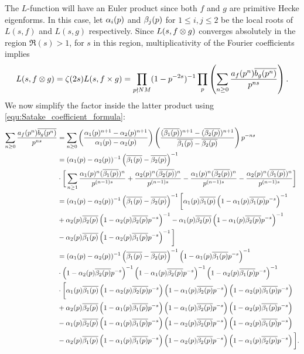       The $L$-function will have an Euler product since both $f$ and $g$ are primitive Hecke eigenforms. In this case, let $\alpha_{i}(p)$ and $\beta_{j}(p)$ for $1 \le i,j \le 2$ be the local roots of $L(s,f)$ and $L(s,g)$ respectively. Since $L(s,f \otimes g)$ converges absolutely in the region $\Re(s) > 1$, for $s$ in this region, multiplicativity of the Fourier coefficients implies
      \[
        L(s,f \otimes g) = \zeta(2s)L(s,f \times g) = \prod_{p \nmid NM}(1-p^{-2s})^{-1}\prod_{p}\left(\sum_{n \ge 0}\frac{a_{f}(p^{n})\overline{b_{g}(p^{n})}}{p^{ns}}\right).
      \]
      We now simplify the factor inside the latter product using \cref{equ:Satake_coefficient_formula}:
      \begingroup
      \allowdisplaybreaks
        \begin{align*}
          \sum_{n \ge 0}\frac{a_{f}(p^{n})\overline{b_{g}(p^{n})}}{p^{ns}} &= \sum_{n \ge 0}\left(\frac{\alpha_{1}(p)^{n+1}-\alpha_{2}(p)^{n+1}}{\alpha_{1}(p)-\alpha_{2}(p)}\right)\left(\frac{(\overline{\beta_{1}(p)})^{n+1}-(\overline{\beta_{2}(p)})^{n+1}}{\overline{\beta_{1}(p)}-\overline{\beta_{2}(p)}}\right)p^{-ns} \\
          &= (\alpha_{1}(p)-\alpha_{2}(p))^{-1}\left(\overline{\beta_{1}(p)}-\overline{\beta_{2}(p)}\right)^{-1} \\
          &\cdot \bigg[\sum_{n \ge 1}\frac{\alpha_{1}(p)^{n}(\overline{\beta_{1}(p)})^{n}}{p^{(n-1)s}}+\frac{\alpha_{2}(p)^{n}(\overline{\beta_{2}(p)})^{n}}{p^{(n-1)s}}-\frac{\alpha_{1}(p)^{n}(\overline{\beta_{2}(p)})^{n}}{p^{(n-1)s}}-\frac{\alpha_{2}(p)^{n}(\overline{\beta_{1}(p)})^{n}}{p^{(n-1)s}}\bigg] \\
          &= (\alpha_{1}(p)-\alpha_{2}(p))^{-1}\left(\overline{\beta_{1}(p)}-\overline{\beta_{2}(p)}\right)^{-1}\bigg[\alpha_{1}(p)\overline{\beta_{1}(p)}\left(1-\alpha_{1}(p)\overline{\beta_{1}(p)}p^{-s}\right)^{-1} \\
          &+\alpha_{2}(p)\overline{\beta_{2}(p)}\left(1-\alpha_{2}(p)\overline{\beta_{2}(p)}p^{-s}\right)^{-1}-\alpha_{1}(p)\overline{\beta_{2}(p)}\left(1-\alpha_{1}(p)\overline{\beta_{2}(p)}p^{-s}\right)^{-1} \\
          &-\alpha_{2}(p)\overline{\beta_{1}(p)}\left(1-\alpha_{2}(p)\overline{\beta_{1}(p)}p^{-s}\right)^{-1}\bigg] \\
          &= (\alpha_{1}(p)-\alpha_{2}(p))^{-1}\left(\overline{\beta_{1}(p)}-\overline{\beta_{2}(p)}\right)^{-1}\left(1-\alpha_{1}(p)\overline{\beta_{1}(p)}p^{-s}\right)^{-1} \\
          &\cdot\left(1-\alpha_{2}(p)\overline{\beta_{2}(p)}p^{-s}\right)^{-1}\left(1-\alpha_{1}(p)\overline{\beta_{2}(p)}p^{-s}\right)^{-1}\left(1-\alpha_{2}(p)\overline{\beta_{1}(p)}p^{-s}\right)^{-1} \\
          &\cdot\bigg[\alpha_{1}(p)\overline{\beta_{1}(p)}\left(1-\alpha_{2}(p)\overline{\beta_{2}(p)}p^{-s}\right)\left(1-\alpha_{1}(p)\overline{\beta_{2}(p)}p^{-s}\right)\left(1-\alpha_{2}(p)\overline{\beta_{1}(p)}p^{-s}\right) \\
          &+\alpha_{2}(p)\overline{\beta_{2}(p)}\left(1-\alpha_{1}(p)\overline{\beta_{1}(p)}p^{-s}\right)\left(1-\alpha_{1}(p)\overline{\beta_{2}(p)}p^{-s}\right)\left(1-\alpha_{2}(p)\overline{\beta_{1}(p)}p^{-s}\right) \\
          &-\alpha_{1}(p)\overline{\beta_{2}(p)}\left(1-\alpha_{1}(p)\overline{\beta_{1}(p)}p^{-s}\right)\left(1-\alpha_{2}(p)\overline{\beta_{2}(p)}p^{-s}\right)\left(1-\alpha_{2}(p)\overline{\beta_{1}(p)}p^{-s}\right) \\
          &-\alpha_{2}(p)\overline{\beta_{1}(p)}\left(1-\alpha_{1}(p)\overline{\beta_{1}(p)}p^{-s}\right)\left(1-\alpha_{2}(p)\overline{\beta_{2}(p)}p^{-s}\right)\left(1-\alpha_{1}(p)\overline{\beta_{2}(p)}p^{-s}\right)\bigg].
        \end{align*}
